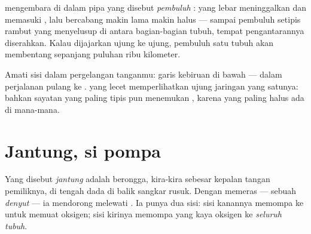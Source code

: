 \begin{definition}\label{def:g4:heart-and-blood:vessels}
 mengembara di dalam pipa yang disebut \emph{pembuluh}
: yang lebar meninggalkan dan memasuki , lalu bercabang
makin lama makin halus --- sampai pembuluh setipis rambut yang
menyelusup di antara bagian-bagian tubuh, tempat pengantarannya
diserahkan. Kalau dijajarkan ujung ke ujung, pembuluh satu tubuh akan
membentang sepanjang puluhan ribu kilometer.
\end{definition}

\begin{remark}\label{rem:g4:heart-and-blood:see}
Amati sisi dalam pergelangan tanganmu: garis kebiruan di bawah 
---  dalam perjalanan pulang ke .  yang
lecet memperlihatkan ujung jaringan yang satunya: bahkan sayatan yang
paling tipis pun menemukan , karena  yang paling halus
ada di mana-mana.
\end{remark}

\section{Jantung, si pompa}

\begin{definition}[Jantung]\label{def:g4:heart-and-blood:heart}
Yang disebut \emph{jantung} adalah  berongga,
kira-kira sebesar kepalan tangan pemiliknya, di tengah dada di balik
sangkar rusuk. Dengan memeras --- sebuah \emph{denyut}
--- ia mendorong  melewati . Ia punya dua sisi: sisi
kanannya memompa  ke \emph{} untuk memuat oksigen; sisi
kirinya memompa  yang kaya oksigen ke \emph{seluruh tubuh}.
\end{definition}

